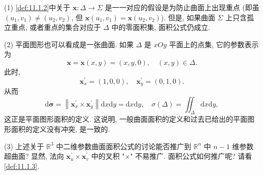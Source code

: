 \begin{remark}\label{rem:11.1.1}
(1) \cref{def:11.1.2}中关于 $\boldsymbol{x}: \Delta \to \Sigma$ 是一一对应的假设是为防止曲面上出现重点 (即虽 $\left(u_{1}, v_{1}\right) \neq\left(u_{2}, v_{2}\right)$, 但 $\boldsymbol{x}\left(u_{1}, v_{1}\right)=\boldsymbol{x}\left(u_{2}, v_{2}\right)$). 但是, 如果曲面 $\Sigma$ 上只含孤立重点, 或者重点的集合对应于 $\Delta$ 中的零面积集, 面积公式仍成立.

(2) 平面图形也可以看成是一张曲面. 如果 $\Delta$ 是 $x O y$ 平面上的点集, 它的参数表示为
\[
  \boldsymbol{x}=\boldsymbol{x}(x, y)=(x, y, 0), \quad(x, y) \in \Delta.
\]
此时,
\[
  \boldsymbol{x}_{x}^{\prime}=(1,0,0), \quad \boldsymbol{x}_{y}^{\prime}=(0,1,0).
\]
从而
\[
  \mathrm{d} \boldsymbol{\sigma}=\left\|\boldsymbol{x}_{x}^{\prime} \times \boldsymbol{x}_{y}^{\prime}\right\| \mathrm{d} x \mathrm{d} y=\mathrm{d} x \mathrm{d} y, \quad \sigma(\Delta)=\iint_{\Delta} \mathrm{d} x \mathrm{d} y,
\]
这正是平面图形面积的定义. 这说明, 一般曲面面积的定义和过去已给出的平面图形面积的定义没有冲突, 是一致的.

(3) 上述关于 $\mathbb{R}^{3}$ 中二维参数曲面面积公式的讨论能否推广到 $\mathbb{R}^{n}$ 中 $n-1$ 维参数超曲面? 显然, 法向 $\boldsymbol{x}_{u}^{\prime} \times \boldsymbol{x}_{v}^{\prime}$ 中的叉积 "$\times$" 不易推广. 面积公式如何推广呢? 请看\cref{def:11.1.3}.
\end{remark}

